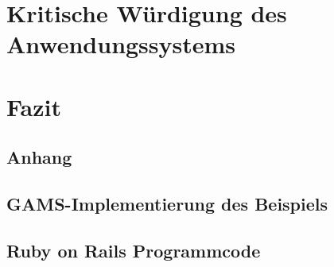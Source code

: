 \documentclass[a4paper,12pt,parskip,bibtotoc,liststotoc]{article}
\begin{document}
\section{Kritische Würdigung des Anwendungssystems} \label{krit}

\section{Fazit} \label{Fazit}

\newpage

\newpage
%
%
\begin{appendix}
\section{Anhang}

\subsection{GAMS-Implementierung des Beispiels}\label{Imp}

\subsection{Ruby on Rails Programmcode}\label{Anhang2}


\end{appendix}
\end{document}
